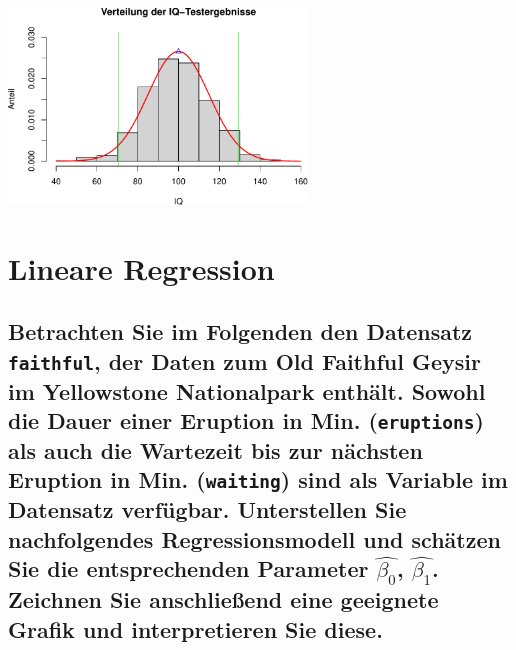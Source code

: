 \documentclass[12pt,a4paper]{article}
\begin{document}
\begin{center}\includegraphics[width=300px]{solution_3_files/figure-latex/unnamed-chunk-15-1} \end{center}

\section{Lineare Regression}\label{lineare-regression}

\subsection{\texorpdfstring{Betrachten Sie im Folgenden den Datensatz
\texttt{faithful}, der Daten zum Old Faithful Geysir im Yellowstone
Nationalpark enthält. Sowohl die Dauer einer Eruption in Min.
(\texttt{eruptions}) als auch die Wartezeit bis zur nächsten Eruption in
Min. (\texttt{waiting}) sind als Variable im Datensatz verfügbar.
Unterstellen Sie nachfolgendes Regressionsmodell und schätzen Sie die
entsprechenden Parameter \(\widehat{\beta_0}\), \(\widehat{\beta_1}\).
Zeichnen Sie anschließend eine geeignete Grafik und interpretieren Sie
diese.}{Betrachten Sie im Folgenden den Datensatz faithful, der Daten zum Old Faithful Geysir im Yellowstone Nationalpark enthält. Sowohl die Dauer einer Eruption in Min. (eruptions) als auch die Wartezeit bis zur nächsten Eruption in Min. (waiting) sind als Variable im Datensatz verfügbar. Unterstellen Sie nachfolgendes Regressionsmodell und schätzen Sie die entsprechenden Parameter \textbackslash widehat\{\textbackslash beta\_0\}, \textbackslash widehat\{\textbackslash beta\_1\}. Zeichnen Sie anschließend eine geeignete Grafik und interpretieren Sie diese.}}\label{betrachten-sie-im-folgenden-den-datensatz-faithful-der-daten-zum-old-faithful-geysir-im-yellowstone-nationalpark-enthuxe4lt.-sowohl-die-dauer-einer-eruption-in-min.-eruptions-als-auch-die-wartezeit-bis-zur-nuxe4chsten-eruption-in-min.-waiting-sind-als-variable-im-datensatz-verfuxfcgbar.-unterstellen-sie-nachfolgendes-regressionsmodell-und-schuxe4tzen-sie-die-entsprechenden-parameter-widehatbeta_0-widehatbeta_1.-zeichnen-sie-anschlieuxdfend-eine-geeignete-grafik-und-interpretieren-sie-diese.}
\end{document}
